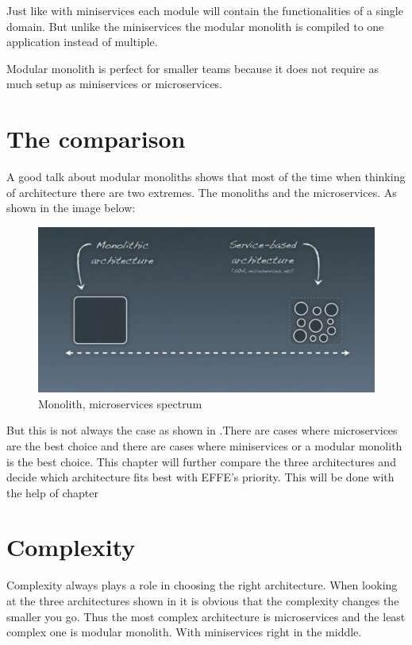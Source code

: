 Just like with miniservices each module will contain the functionalities of a single domain. But unlike the miniservices the modular monolith is compiled to one application instead of multiple.

Modular monolith is perfect for smaller teams because it does not require as much setup as miniservices or microservices.

\section{The comparison}
\label{sec:Comparison}

A good talk about modular monoliths \cite{modularMonolithTalk} shows that most of the time when thinking of architecture there are two extremes. The monoliths and the microservices. As shown in the image below:
\begin{figure}[H]
	\includegraphics[width=\linewidth]{microservices-spectrum.png}
	\caption{Monolith, microservices spectrum \cite{modularMonolithTalk}}
\end{figure}

But this is not always the case as shown in .There are cases where microservices are the best choice and there are cases where miniservices or a modular monolith is the best choice. This chapter will further compare the three architectures and decide which architecture fits best with EFFE's priority. This will be done with the help of chapter 

\section{Complexity}
\label{sec:Complexity}

Complexity always plays a role in choosing the right architecture. When looking at the three architectures shown in  it is obvious that the complexity changes the smaller you go. Thus the most complex architecture is microservices and the least complex one is modular monolith. With miniservices right in the middle.

